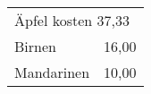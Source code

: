 \documentclass{article}
\begin{document}
  \begin{tabular}{|ll|}
      \hline
      \multicolumn{2}{|l|}{Äpfel kosten 37,33} \\
      Birnen & 16,00 \\
      Mandarinen & 10,00 \\
      \hline
  \end{tabular}
\end{document}
